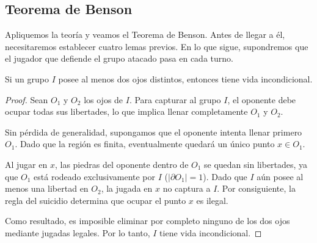 \subsection{Teorema de Benson}
Apliquemos la teoría y veamos el Teorema de Benson. Antes de llegar a él, necesitaremos establecer cuatro lemas previos. En lo que sigue, supondremos que el jugador que defiende el grupo atacado pasa en cada turno.
\begin{lemma}\label{lem_1_benson}
	Si un grupo $I$ posee al menos dos ojos distintos, entonces tiene vida incondicional.
\end{lemma}
\begin{proof}
	Sean $O_1$ y $O_2$ los ojos de $I$. Para capturar al grupo $I$, el oponente debe ocupar todas sus libertades, lo que implica llenar completamente $O_1$ y $O_2$.
	
	Sin pérdida de generalidad, supongamos que el oponente intenta llenar primero $O_1$. Dado que la región es finita, eventualmente quedará un único punto $x \in O_1$.
	
	Al jugar en $x$, las piedras del oponente dentro de $O_1$ se quedan sin libertades, ya que $O_1$ está rodeado exclusivamente por $I$ ($|\partial O_1| = 1$). Dado que $I$ aún posee al menos una libertad en $O_2$, la jugada en $x$ no captura a $I$. Por consiguiente, la regla del suicidio determina que ocupar el punto $x$ es ilegal.
	
	Como resultado, es imposible eliminar por completo ninguno de los dos ojos mediante jugadas legales. Por lo tanto, $I$ tiene vida incondicional.
\end{proof}
